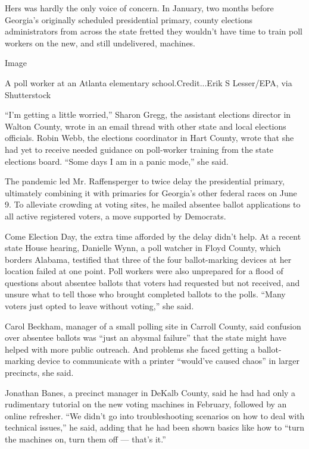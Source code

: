 Hers was hardly the only voice of concern. In January, two months before
Georgia's originally scheduled presidential primary, county elections
administrators from across the state fretted they wouldn't have time to
train poll workers on the new, and still undelivered, machines.

Image

A poll worker at an Atlanta elementary school.Credit...Erik S
Lesser/EPA, via Shutterstock

``I'm getting a little worried,'' Sharon Gregg, the assistant elections
director in Walton County, wrote in an email thread with other state and
local elections officials. Robin Webb, the elections coordinator in Hart
County, wrote that she had yet to receive needed guidance on poll-worker
training from the state elections board. ``Some days I am in a panic
mode,'' she said.

The pandemic led Mr. Raffensperger to twice delay the presidential
primary, ultimately combining it with primaries for Georgia's other
federal races on June 9. To alleviate crowding at voting sites, he
mailed absentee ballot applications to all active registered voters, a
move supported by Democrats.

Come Election Day, the extra time afforded by the delay didn't help. At
a recent state House hearing, Danielle Wynn, a poll watcher in Floyd
County, which borders Alabama, testified that three of the four
ballot-marking devices at her location failed at one point. Poll workers
were also unprepared for a flood of questions about absentee ballots
that voters had requested but not received, and unsure what to tell
those who brought completed ballots to the polls. ``Many voters just
opted to leave without voting,'' she said.

Carol Beckham, manager of a small polling site in Carroll County, said
confusion over absentee ballots was ``just an abysmal failure'' that the
state might have helped with more public outreach. And problems she
faced getting a ballot-marking device to communicate with a printer
``would've caused chaos'' in larger precincts, she said.

Jonathan Banes, a precinct manager in DeKalb County, said he had had
only a rudimentary tutorial on the new voting machines in February,
followed by an online refresher. ``We didn't go into troubleshooting
scenarios on how to deal with technical issues,'' he said, adding that
he had been shown basics like how to ``turn the machines on, turn them
off --- that's it.''

